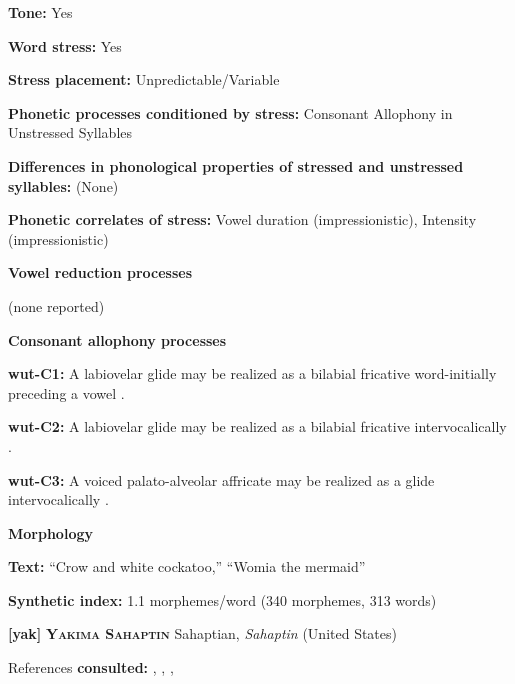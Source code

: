 \textbf{Tone:} Yes



\textbf{Word stress:} Yes



\textbf{Stress placement:} Unpredictable/Variable



\textbf{Phonetic processes conditioned by stress:} Consonant Allophony in Unstressed Syllables



\textbf{Differences in phonological properties of stressed and unstressed syllables:} (None)



\textbf{Phonetic correlates of stress:} Vowel duration (impressionistic), Intensity (impressionistic)



\textbf{Vowel reduction processes}



(none reported)



\textbf{Consonant allophony processes}



\textbf{wut-C1:} A labiovelar glide may be realized as a bilabial fricative word-initially preceding a vowel \citep[57-8]{Marmion2010}.



\textbf{wut-C2:} A labiovelar glide may be realized as a bilabial fricative intervocalically \citep[57-8]{Marmion2010}.



\textbf{wut-C3:} A voiced palato-alveolar affricate may be realized as a glide intervocalically \citep[55]{Marmion2010}.



\textbf{Morphology}



\textbf{Text:} “Crow and white cockatoo,” “Womia the mermaid” \citep[378-382]{Marmion2010}



\textbf{Synthetic index:} 1.1 morphemes/word (340 morphemes, 313 words)



\textbf{[yak]}   \textbf{\textsc{Yakima Sahaptin}}  Sahaptian, \textit{Sahaptin} (United States)



References \textbf{consulted:} \citet{HargusBeavert2002,HargusBeavert2005,HargusBeavert2006,Jansen2010}, \citet{Minthorn2005}, \citet{RigsbyRude1996}, \citet{Rude2009,RudeCTUIR2014}



